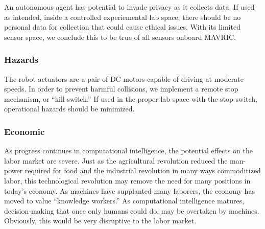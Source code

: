 \documentclass{article}
\begin{document}
                    An autonomous agent has potential to invade privacy as it collects data.
                    If used as intended, inside a controlled experiemental lab space,
                    there should be no personal data for collection
                    that could cause ethical issues.
                    With its limited sensor space,
                    we conclude this to be true of all sensors onboard MAVRIC.
                
                \subsubsection{Hazards}
                
                    The robot actuators are a pair of DC motors
                    capable of driving at moderate speeds.
                    In order to prevent harmful collisions,
                    we implement a remote stop mechanism, or ``kill switch.''
                    If used in the proper lab space with the stop switch,
                    operational hazards should be minimized.
                
                \subsubsection{Economic}
                
                    As progress continues in computational intelligence,
                    the potential effects on the labor market are severe.
                    Just as the agricultural revolution reduced the man-power required for food
                    and the industrial revolution in many ways commoditized labor,
                    this technological revolution may remove the need
                    for many positions in today's economy.
                    As machines have supplanted many laborers,
                    the economy has moved to value ``knowledge workers.''
                    As computational intelligence matures,
                    decision-making that once only humans could do, may be overtaken by machines.
                    Obviously, this would be very disruptive to the labor market.

\end{document}
